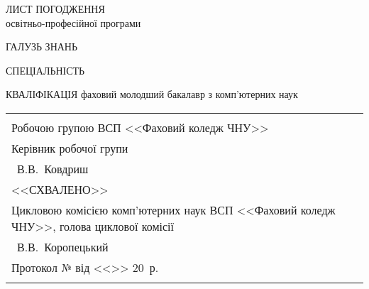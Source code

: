 \begin{titlepage}
\begin{center}
ЛИСТ ПОГОДЖЕННЯ\\
освітньо-професійної програми
\end{center}


ГАЛУЗЬ ЗНАНЬ \galuz

СПЕЦІАЛЬНІСТЬ \spec

КВАЛІФІКАЦІЯ фаховий молодший бакалавр з комп’ютерних наук 

\vspace{1cm}
\begin{tabular}{p{8cm}p{8cm}}
\begin{flushleft}
\begin{minipage}{8cm}
<<РОЗРОБЛЕНО>>\\
Робочою групою ВСП <<Фаховий коледж ЧНУ>>\\
Керівник робочої групи\\
\underline{\hspace{3cm}}~В.В.~Ковдриш\\


\vspace{0.5cm}

<<СХВАЛЕНО>>\\
Цикловою комісією комп'ютерних наук ВСП <<Фаховий коледж ЧНУ>>, голова циклової комісії\\
\underline{\hspace{3cm}}~В.В.~Коропецький\\
Протокол №\underline{\hspace{0.5cm}} від <<\underline{\hspace{0.5cm}}>> \underline{\hspace{1cm}}  20\underline{\hspace{0.5cm}}~р.\\

\vspace{0.5cm}


\end{minipage}
\end{flushleft}
\end{tabular}
\end{titlepage}
